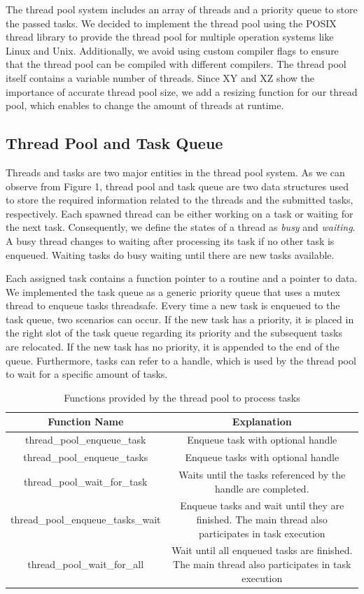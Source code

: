 \documentclass[conference]{IEEEtran}
\begin{document}
The thread pool system includes an array of threads and a priority queue to store the passed tasks. We decided to implement the thread pool using the POSIX thread library to provide the thread pool for multiple operation systems like Linux and Unix. Additionally, we avoid using custom compiler flags to ensure that the thread pool can be compiled with different compilers. The thread pool itself contains a variable number of threads. Since XY and XZ show the importance of accurate thread pool size, we add a resizing function for our thread pool, which enables to change the amount of threads at runtime. 

\subsection{Thread Pool and Task Queue}
Threads and tasks are two major entities in the thread pool system. As we can observe from Figure 1, thread pool and task queue are two data structures used to store the required information related to the threads and the submitted tasks, respectively. Each spawned thread can be either working on a task or waiting for the next task. Consequently, we define the states of a thread as \emph{busy} and \emph{waiting}. A busy thread changes to waiting after processing its task if no other task is enqueued. Waiting tasks do busy waiting until there are new tasks available.

Each assigned task contains a function pointer to a routine and a pointer to data. We implemented the task queue as a generic priority queue that uses a mutex thread to enqueue tasks threadsafe. Every time a new task is enqueued to the task queue, two scenarios can occur. If the new task has a priority, it is placed in the right slot of the task queue regarding its priority and the subsequent tasks are relocated. If the  new task has no priority, it is appended to the end of the queue. Furthermore, tasks can refer to a handle, which is used by the thread pool to wait for a specific amount of tasks.
\begin{table}[htbp]
	\caption{Functions provided by the thread pool to process tasks}
	\begin{center}
		\begin{tabular}{ c c }
			\hline
			\textbf{Function Name}&\textbf{Explanation}\\
			\hline
			thread\_pool\_enqueue\_task & Enqueue task with optional handle \\
			thread\_pool\_enqueue\_tasks & Enqueue tasks with optional handle \\
			thread\_pool\_wait\_for\_task & Waits until the tasks referenced by the handle are completed. \\
			
			thread\_pool\_enqueue\_tasks\_wait & Enqueue tasks and wait until they are finished. The main thread also participates in task execution\\ 
			thread\_pool\_wait\_for\_all & Wait until all enqueued tasks are finished. The main thread also participates in task execution \\ \hline
		\end{tabular}
		\label{tab1}
	\end{center}
\end{table}
\end{document}
